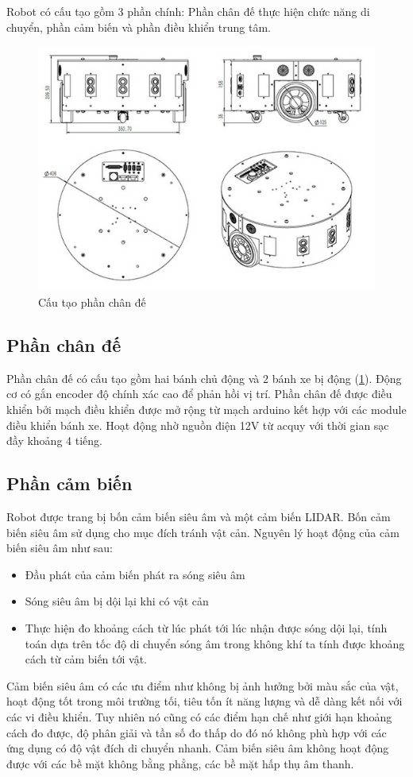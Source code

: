 Robot có cấu tạo gồm 3 phần chính: Phần chân đế thực hiện chức năng di chuyển, phần cảm biến và phần điều khiển trung tâm.

\begin{figure}[htbp]
	\centering
	\includegraphics[width=0.7\linewidth]{figures/dashgo_base.png}
	\caption{Cấu tạo phần chân đế}
	\label{fig:dashgoBase}
\end{figure}

\subsection{Phần chân đế}
Phần chân đế có cấu tạo gồm hai bánh chủ động và 2 bánh xe bị động (\figurename{\ref{fig:dashgoBase}}). Động cơ có gắn encoder độ chính xác cao để phản hồi vị trí. Phần chân đế được điều khiển bởi mạch điều khiển được mở rộng từ mạch arduino kết hợp với các module điều khiển bánh xe. Hoạt động nhờ nguồn điện 12V từ acquy với thời gian sạc đầy khoảng 4 tiếng. 

\subsection{Phần cảm biến}
Robot được trang bị bốn cảm biến siêu âm và một cảm biến LIDAR. Bốn cảm biến siêu âm sử dụng cho mục đích tránh vật cản. Nguyên lý hoạt động của cảm biến siêu âm như sau:
\begin{itemize}
    \item Đầu phát của cảm biến phát ra sóng siêu âm
    \item Sóng siêu âm bị dội lại khi có vật cản
    \item Thực hiện đo khoảng cách từ lúc phát tới lúc nhận được sóng dội lại, tính toán dựa trên tốc độ di chuyển sóng âm trong không khí ta tính được khoảng cách từ cảm biến tới vật.
\end{itemize}
Cảm biến siêu âm có các ưu điểm như không bị ảnh hưởng bởi màu sắc của vật, hoạt động tốt trong môi trường tối, tiêu tốn ít năng lượng và dễ dàng kết nối với các vi điều khiển. Tuy nhiên nó cũng có các điểm hạn chế như giới hạn khoảng cách đo được, độ phân giải và tần số đo thấp do đó nó không phù hợp với các ứng dụng có độ vật đích di chuyển nhanh. Cảm biến siêu âm không hoạt động được với các bề mặt không bằng phẳng, các bề mặt hấp thụ âm thanh.

